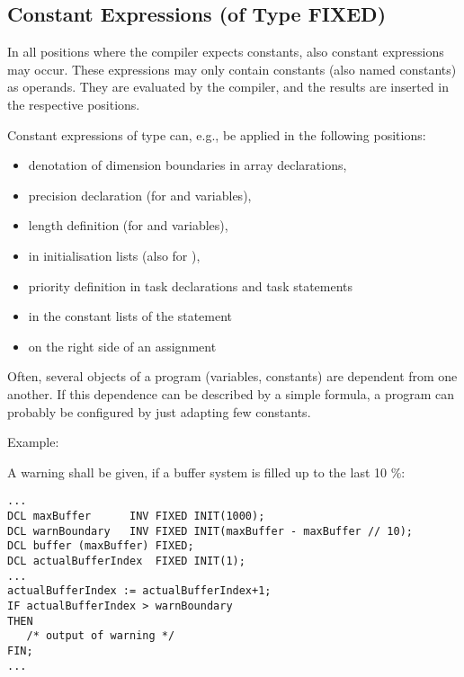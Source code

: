 \subsection{Constant Expressions (of Type FIXED)}   %
\label{sec_const_expression}

In all positions where the compiler expects constants, also constant
expressions may occur. These expressions may only contain constants
(also named constants) as operands. They are evaluated by the compiler,
and the results are inserted in the respective positions.

\begin{grammarframe}




\end{grammarframe}



Constant expressions of type  can, e.g., be applied in the
following positions:
\begin{itemize}
\item denotation of dimension boundaries in array declarations,
\item precision declaration (for  and  variables),
\item length definition (for  and  variables),
\item in initialisation lists (also for ),
\item priority definition in task declarations and task statements
\item in the constant lists of the  statement
\item on the right side of an assignment
\end{itemize}

Often, several objects of a program (variables, constants) are dependent
from one another. If this dependence can be described by a simple
formula, a program can probably be configured by just adapting few
constants.

Example:

A warning shall be given, if a buffer system is filled up to the last 10
\%:

\begin{lstlisting}
...
DCL maxBuffer      INV FIXED INIT(1000); 
DCL warnBoundary   INV FIXED INIT(maxBuffer - maxBuffer // 10);
DCL buffer (maxBuffer) FIXED;
DCL actualBufferIndex  FIXED INIT(1);
... 
actualBufferIndex := actualBufferIndex+1;
IF actualBufferIndex > warnBoundary 
THEN 
   /* output of warning */ 
FIN;
...
\end{lstlisting}
